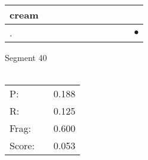 \documentclass[landscape]{article}
\newcommand{\ssp}{\hspace{2pt}}
\newcommand{\mex}{\cellcolor{g}$\bullet$}
\begin{document}
\begin{tabular}{|l|p{10pt}|p{10pt}|p{10pt}|p{10pt}|p{10pt}|p{10pt}|p{10pt}|p{10pt}|p{10pt}|p{10pt}|}
\hline
\ssp cream \ssp&\hspace{2pt}&\hspace{2pt}&\hspace{2pt}&\hspace{2pt}&\hspace{2pt}&\hspace{2pt}&\hspace{2pt}&\hspace{2pt}&\hspace{2pt}&\hspace{2pt}\\
\hline
\ssp \cellcolor{ref9}. \ssp&\hspace{2pt}&\hspace{2pt}&\hspace{2pt}&\hspace{2pt}&\hspace{2pt}&\hspace{2pt}&\hspace{2pt}&\hspace{2pt}&\hspace{2pt}&\hspace{2pt}\mex\\
\hline
\end{tabular}

\vspace{6pt}
\noindent Segment 40\\\\
\noindent\begin{tabular}{lm{12pt}r}
\hline
P:&&0.188\\
R:&&0.125\\
Frag:&&0.600\\
Score:&&0.053\\
\end{tabular}

\newpage
\end{document}
